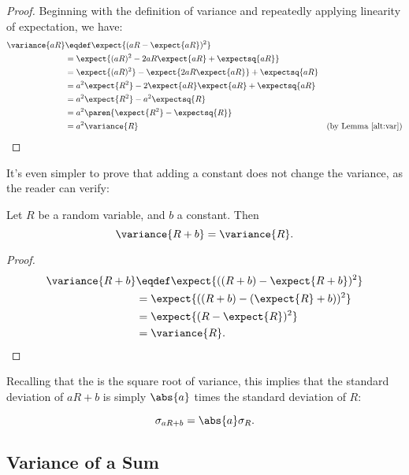 \begin{proof}
Beginning with the definition of variance and repeatedly applying
linearity of expectation, we have:
\begin{align*}
\variance{aR}
    & \eqdef \expect{(aR-\expect{aR})^2}\\
    & = \expect{(aR)^2 -2aR\expect{aR} + \expectsq{aR}}\\
    & = \expect{(aR)^2} -\expect{2aR\expect{aR}} + \expectsq{aR}\\
    & = a^2\expect{R^2} -2\expect{aR}\expect{aR} + \expectsq{aR}\\
    & = a^2\expect{R^2} -a^2\expectsq{R}\\
    & = a^2\paren{\expect{R^2} - \expectsq{R}}\\
    & = a^2\variance{R} & \text{(by Lemma~\ref{alt:var})}
\end{align*}
\end{proof}

It's even simpler to prove that adding a constant does not change the
variance, as the reader can verify:
\begin{theorem}\label{var+const}
Let $R$ be a random variable, and $b$ a constant. Then
\begin{equation}\label{R+b}
\variance{R+b} = \variance{R}.
\end{equation}
\end{theorem}

\begin{solution}
\begin{proof}
\begin{align*}
\variance{R+b} & \eqdef \expect{((R+b) - \expect{R+b})^2}\\
               & =  \expect{((R+b) - (\expect{R}+ b))^2}\\
               & =  \expect{(R - \expect{R})^2}\\
               & = \variance{R}.
\end{align*}
\end{proof}

\end{solution}

Recalling that the  is the square root of
variance, this implies that the standard deviation of $a R + b$ is simply
$\abs{a}$ times the standard deviation of $R$:
\begin{corollary}
\[
\sigma_{aR+b} = \abs{a}\sigma_{R}.
\]
\end{corollary}


\subsection{Variance of a Sum}

